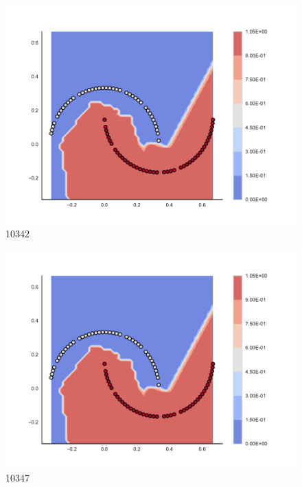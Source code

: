 \begin{subfigure}[b]{0.09\textwidth}
    \includegraphics[clip, trim=2.35cm 1.75cm 4.5cm 0cm,width=\textwidth]{img/convergence/10342.pdf}
    \caption{10342}
    \label{fig:convergence_10342}
\end{subfigure}
%
\begin{subfigure}[b]{0.09\textwidth}
    \includegraphics[clip, trim=2.35cm 1.75cm 4.5cm 0cm,width=\textwidth]{img/convergence/10347.pdf}
    \caption{10347}
    \label{fig:convergence_10347}
\end{subfigure}
%

